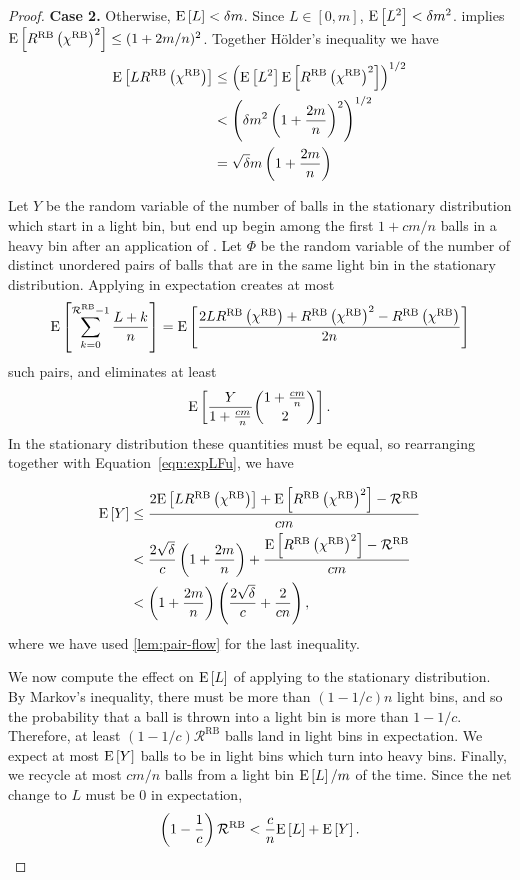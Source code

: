 \begin{proof}
\medskip 

{\bf Case 2.} Otherwise, $\mathrm{E}\left[L\right] < \delta m$. Since $L \in [0, m]$, $\mathrm{E}\left[L^2\right] <
	\delta m^2$.  implies $\mathrm{E}\left[R^\textrm{RB}\left(\chi^\textrm{RB}\right)^2\right] \le (1+2m/n)^2$. Together H\"{o}lder's inequality we have
\begin{align}
	\mathrm{E}\left[LR^\textrm{RB}\left(\chi^\textrm{RB}\right)\right]
	&\le \left(\mathrm{E}\left[L^2\right]\mathrm{E}\left[R^\textrm{RB}\left(\chi^\textrm{RB}\right)^2\right]\right)^{1/2} \nonumber \\
	&< \left(\delta m^2 \left(1+\frac{2m}{n}\right)^2\right)^{1/2} \nonumber\\
	&= \sqrt{\delta} m\left(1 + \frac{2m}{n}\right) \label{eqn:expLFu}
\end{align}

	Let $Y$ be the random variable of the number of balls in the stationary
	distribution which start in a light bin, but end up begin among the first
	$1 + cm/n$ balls in a heavy bin after an application of \RB.  Let $\Phi$
	be the random variable of the number of distinct unordered pairs of balls
	that are in the same light bin in the stationary distribution. Applying \RB
	in expectation creates at most
        \[ \mathrm{E}\left[\sum_{k=0}^{\mathcal{R}^\textrm{RB}-1}\frac{L + k}{n}\right] = \mathrm{E}\left[\frac{2LR^\textrm{RB}\left(\chi^\textrm{RB}\right) + R^\textrm{RB}\left(\chi^\textrm{RB}\right)^2 - R^\textrm{RB}\left(\chi^\textrm{RB}\right)}{2n}\right] \]
	such pairs, and eliminates at least
	\[ \mathrm{E}\left[\frac{Y}{1+\frac{cm}{n}}\binom{1+\frac{cm}{n}}{2}\right].\]
	In the stationary distribution these quantities must be equal, so
	rearranging together with Equation~\eqref{eqn:expLFu}, we have
	
\begin{align*}
	\mathrm{E}\left[Y\right] 
	&\le \frac{2\mathrm{E}\left[LR^\textrm{RB}\left(\chi^\textrm{RB}\right)\right] + \mathrm{E}\left[R^\textrm{RB}\left(\chi^\textrm{RB}\right)^2\right] - \mathcal{R}^\textrm{RB}}{cm} \nonumber \\
	&< \frac{2\sqrt{\delta}}{c}\left(1+\frac{2m}{n}\right) + \frac{\mathrm{E}\left[R^\textrm{RB}\left(\chi^\textrm{RB}\right)^2\right] - \mathcal{R}^\textrm{RB}}{cm} \\
	&<\left(1+\frac{2m}{n}\right)\left(\frac{2\sqrt{\delta}}{c}+\frac{2}{cn}\right),  
\end{align*}
where we have used \cref{lem:pair-flow} for the last inequality.

We now compute the effect on $\mathrm{E}\left[L\right]$ of applying \RB to the stationary
distribution.  By Markov's inequality, there must be more than $(1-1/c)n$ light
bins, and so the probability that a ball is thrown into a light bin is more
than $1-1/c$. Therefore, at least $(1-1/c)\mathcal{R}^\textrm{RB}$ balls land
in light bins in expectation. We expect at most $\mathrm{E}\left[Y\right]$ balls to be in light
bins which turn into heavy bins. Finally, we recycle at most $cm/n$ balls from
a light bin $\mathrm{E}\left[L\right]/m$ of the time. Since the net change to $L$ must be $0$ in
expectation,
\[\left(1-\frac{1}{c}\right)\mathcal{R}^\textrm{RB} < \frac{c}{n}\mathrm{E}\left[L\right] + \mathrm{E}\left[Y\right].\]


\end{proof}
